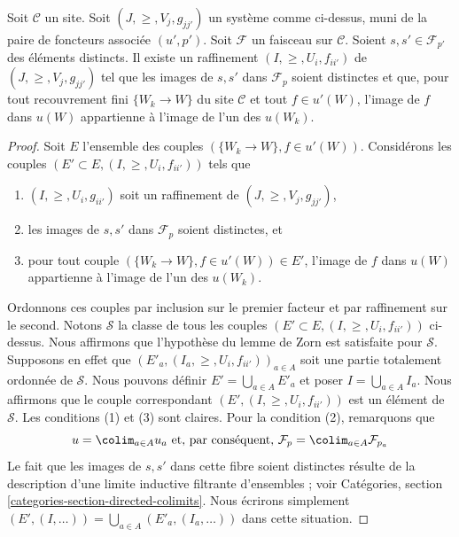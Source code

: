 \begin{lemma}
\label{lemma-refine-all-at-once}
Soit $\mathcal{C}$ un site.
Soit $(J, \geq, V_j, g_{jj'})$ un système comme ci-dessus, muni de la
paire de foncteurs associée $(u', p')$.
Soit $\mathcal{F}$ un faisceau sur $\mathcal{C}$.
Soient $s, s' \in \mathcal{F}_{p'}$ des éléments distincts.
Il existe un raffinement $(I, \geq, U_i, f_{ii'})$
de $(J, \geq, V_j, g_{jj'})$ tel que les images de $s, s'$ dans
$\mathcal{F}_p$ soient distinctes et que,
pour tout recouvrement fini $\{W_k \to W\}$ du site
$\mathcal{C}$ et tout $f \in u'(W)$, l’image de $f$ dans $u(W)$
appartienne à l’image de l’un des $u(W_k)$.
\end{lemma}

\begin{proof}
Soit $E$ l’ensemble des couples $(\{W_k \to W\}, f\in u'(W))$.
Considérons les couples $(E' \subset E, (I, \geq, U_i, f_{ii'}))$
tels que
\begin{enumerate}
\item $(I, \geq, U_i, g_{ii'})$ soit un raffinement de $(J, \geq, V_j, g_{jj'})$,
\item les images de $s, s'$ dans $\mathcal{F}_p$ soient distinctes, et
\item pour tout couple $(\{W_k \to W\}, f\in u'(W)) \in E'$, l’image de
$f$ dans $u(W)$ appartienne à l’image de l’un des $u(W_k)$.
\end{enumerate}
Ordonnons ces couples par inclusion sur le premier facteur et
par raffinement sur le second. Notons $\mathcal{S}$ la classe
de tous les couples $(E' \subset E, (I, \geq, U_i, f_{ii'}))$ ci-dessus.
Nous affirmons que l’hypothèse du lemme de Zorn est satisfaite pour $\mathcal{S}$.
Supposons en effet que $(E'_a, (I_a, \geq, U_i, f_{ii'}))_{a \in A}$
soit une partie totalement ordonnée de $\mathcal{S}$. Nous pouvons définir
$E' = \bigcup_{a \in A} E'_a$ et poser $I = \bigcup_{a \in A} I_a$.
Nous affirmons que le couple correspondant
$(E' , (I, \geq, U_i, f_{ii'}))$ est un élément de $\mathcal{S}$.
Les conditions (1) et (3) sont claires. Pour la condition (2), remarquons
que
$$
u = \colim_{a \in A} u_a
\text{ et, par conséquent, }
\mathcal{F}_p = \colim_{a \in A} \mathcal{F}_{p_a}
$$
Le fait que les images de $s, s'$ dans cette fibre soient distinctes résulte
de la description d’une limite inductive filtrante d’ensembles ; voir
Catégories, section \ref{categories-section-directed-colimits}.
Nous écrirons simplement
$(E', (I, \ldots)) = \bigcup_{a \in A}(E'_a, (I_a, \ldots))$
dans cette situation.


\end{proof}
